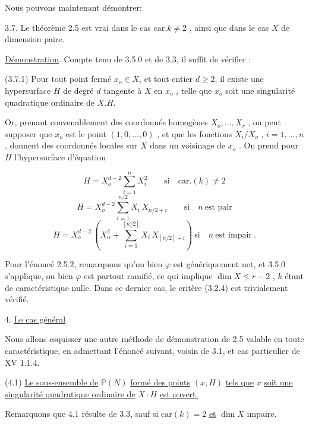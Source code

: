 Nous pouvons maintenant démontrer:

3.7.  Le théorème 2.5 est vrai dans le cas $\mathrm{car}.k \neq 2$ , ainsi que dans le cas $X$ de dimension paire.

\underline{Démonstration}.  Compte tenu de 3.5.0 et de 3.3, il suffit de vérifier :

(3.7.1) Pour tout point fermé $x_o \in X$, et tout entier $d \geqslant 2$, il existe une hypersurface $H$ de degré $d$ tangente à $X$ en $x_o$ , telle que $x_o$ soit une singularité quadratique ordinaire de $X.H$.

Or, prenant convenablement des coordonnés homogènes $X_o,\ldots,X_r$ , on peut supposer que $x_o$ est le point $(1,0,\ldots,0)$ , et que les fonctions $X_i/X_o$ , $i = 1,\ldots,n$ , donnent des coordonnés locales sur $X$ dans un voisinage de $x_o$ . On prend pour $H$ l'hypersurface d'équation

\begin{equation}\tag{3.7.1.1}
H = X_o^{d-2} \sum_{i=1}^{n} X_i^2 \qquad \text{si} \quad \mathrm{car}.(k) \neq 2
\end{equation}
\begin{equation}\tag{3.7.1.2}
H = X_o^{d-2} \sum_{i=1}^{n/2} X_i \, X_{n/2+i} \qquad \text{si} \quad n \ \text{est pair}
\end{equation}
\begin{equation}\tag{3.7.1.3}
H = X_o^{d-2} \, (X_n^2 + \sum_{i=1}^{[n/2]} X_i \, X_{[n/2]+i}) \ \text{si} \quad n \ \text{est impair} \ .
\end{equation}


Pour l'énoncé 2.5.2, remarquons qu'ou bien $\varphi$ est génériquement net, et 3.5.0 s'applique, ou bien $\varphi$ est partout ramifié, ce qui implique $\dim X \leqslant r-2$ , $k$ étant de caractéristique nulle. Dans ce dernier cas, le critère (3.2.4) est trivialement vérifié.


4.  \underline{Le cas général}

Nous allons esquisser une autre méthode de démonstration de 2.5 valable en toute caractéristique, en admettant l'énoncé suivant, voisin de 3.1, et cas particulier de XV 1.1.4.

(4.1) \underline{Le sous-ensemble de} $\mathbb{P}(N)$ \underline{formé des points} $(x, H)$ \underline{tels que} $x$ \underline{soit une singularité quadratique ordinaire de} $X \cdot H$ \underline{est ouvert.}

Remarquons que 4.1 résulte de 3.3, sauf si $\mathrm{car}(k) = 2$ \underline{et} $\dim X$ impaire.

